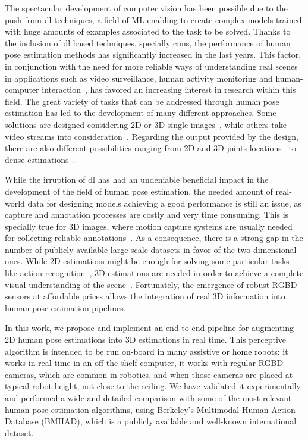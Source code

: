 The spectacular development of computer vision has been possible due to the push from \gls{dl} techniques, a field of ML enabling to create complex models trained with huge amounts of examples associated to the task to be solved. Thanks to the inclusion of \gls{dl} based techniques, specially \glspl{cnn}, the performance of human pose estimation methods has significantly increased in the last years. This factor, in conjunction with the need for more reliable ways of understanding real scenes in applications such as video surveillance, human activity monitoring and human-computer interaction~\cite{sarafianos20163d}, has favored an increasing interest in research within this field. The great variety of tasks that can be addressed through human pose estimation has led to the development of many different approaches. Some solutions are designed considering 2D or 3D single images~\cite{dang2019deep}, while others take video streams into consideration~\cite{Gong2016-kd, ye2013survey}. Regarding the output provided by the design, there are also different possibilities ranging from 2D and 3D joints locations~\cite{perez2014survey} to dense estimations~\cite{Alp_Guler2018-rg}.

While the irruption of \gls{dl} has had an undeniable beneficial impact in the development of the field of human pose estimation, the needed amount of real-world data for designing models achieving a good performance is still an issue, as capture and annotation processes are costly and very time consuming. This is specially true for 3D images, where motion capture systems are usually needed for collecting reliable annotations~\cite{ionescu2013human3, sigal2010humaneva}. As a consequence, there is a strong gap in the number of publicly available large-scale datasets in favor of the two-dimensional ones. While 2D estimations might be enough for solving some particular tasks like action recognition~\cite{liu2018recognizing}, 3D estimations are needed in order to achieve a complete visual understanding of the scene~\cite{sarafianos20163d}. Fortunately, the emergence of robust RGBD sensors at affordable prices allows the integration of real 3D information into human pose estimation pipelines.

In this work, we propose and implement an end-to-end pipeline for augmenting 2D human pose estimations into 3D estimations in real time. This perceptive algorithm is intended to be run on-board in many assistive or home robots: it works in real time in an off-the-shelf computer, it works with regular RGBD cameras, which are common in robotics, and when those cameras are placed at typical robot height, not close to the ceiling. We have validated it experimentally and performed a wide and detailed comparison with some of the most relevant human pose estimation algorithms, using Berkeley's Multimodal Human Action Database (BMHAD)\cite{ofli2013berkeley}, which is a publicly available and well-known international dataset.

